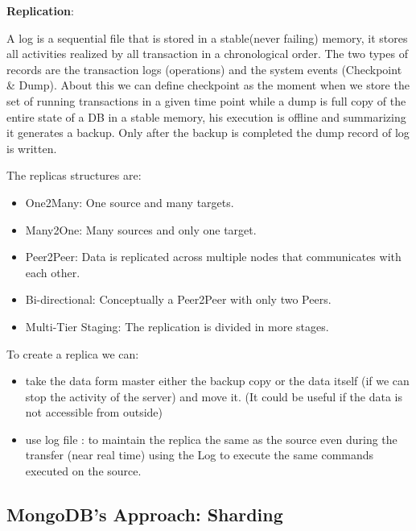 \documentclass[a4page, 11pt]{article}
\begin{document}
\textbf{Replication}:

A log is a sequential file that is stored in a stable(never failing) memory, it stores all activities realized by all transaction in a chronological order. The two types of records are the transaction logs (operations) and the system events (Checkpoint \& Dump). About this we can define checkpoint as the moment when we store the set of running transactions in a given time point while a dump is full copy of the entire state of a DB in a stable memory, his execution is offline and summarizing it generates a backup. Only after the backup is completed the dump record of log is written.

The replicas structures are:
\begin{itemize}[noitemsep]
	\item One2Many: One source and many targets.
	\item Many2One: Many sources and only one target.
	\item Peer2Peer: Data is replicated across multiple nodes that communicates with each other.
	\item Bi-directional: Conceptually a Peer2Peer with only two Peers.
	\item Multi-Tier Staging: The replication is divided in more stages.
\end{itemize}

To create a replica we can:
\begin{itemize}[noitemsep]
	\item take the data form master either the backup copy or the data itself	(if we can stop the activity of the server) and move it. (It could be useful if the data is not accessible from outside)
	\item use log file : to maintain the replica the same as the source even during the transfer (near real time) using the Log to execute the same commands executed on the source.
\end{itemize}


\subsection{MongoDB's Approach: Sharding\cite{ScalingMongoDB}}
\end{document}
